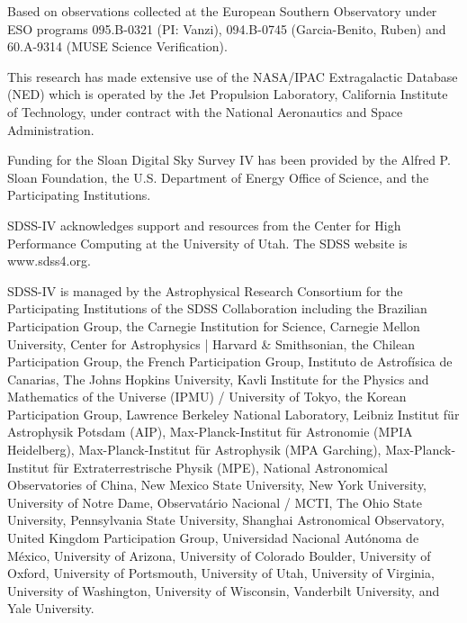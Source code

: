 \documentclass[]{aastex63}
\begin{document}
Based on observations collected at the European Southern Observatory under ESO programs 095.B-0321 (PI: Vanzi), 094.B-0745 (Garcia-Benito, Ruben) and 60.A-9314 (MUSE Science Verification).

This research has made extensive use of the NASA/IPAC Extragalactic Database (NED) which is operated by the Jet Propulsion Laboratory, California Institute of Technology, under contract with the National Aeronautics and Space Administration.

Funding for the Sloan Digital Sky 
Survey IV has been provided by the 
Alfred P. Sloan Foundation, the U.S. 
Department of Energy Office of 
Science, and the Participating 
Institutions. 

SDSS-IV acknowledges support and 
resources from the Center for High 
Performance Computing  at the 
University of Utah. The SDSS 
website is www.sdss4.org.

SDSS-IV is managed by the 
Astrophysical Research Consortium 
for the Participating Institutions 
of the SDSS Collaboration including 
the Brazilian Participation Group, 
the Carnegie Institution for Science, 
Carnegie Mellon University, Center for 
Astrophysics | Harvard \& 
Smithsonian, the Chilean Participation 
Group, the French Participation Group, 
Instituto de Astrof\'isica de 
Canarias, The Johns Hopkins 
University, Kavli Institute for the 
Physics and Mathematics of the 
Universe (IPMU) / University of 
Tokyo, the Korean Participation Group, 
Lawrence Berkeley National Laboratory, 
Leibniz Institut f\"ur Astrophysik 
Potsdam (AIP),  Max-Planck-Institut 
f\"ur Astronomie (MPIA Heidelberg), 
Max-Planck-Institut f\"ur 
Astrophysik (MPA Garching), 
Max-Planck-Institut f\"ur 
Extraterrestrische Physik (MPE), 
National Astronomical Observatories of 
China, New Mexico State University, 
New York University, University of 
Notre Dame, Observat\'ario 
Nacional / MCTI, The Ohio State 
University, Pennsylvania State 
University, Shanghai 
Astronomical Observatory, United 
Kingdom Participation Group, 
Universidad Nacional Aut\'onoma 
de M\'exico, University of Arizona, 
University of Colorado Boulder, 
University of Oxford, University of 
Portsmouth, University of Utah, 
University of Virginia, University 
of Washington, University of 
Wisconsin, Vanderbilt University, 
and Yale University.



 
\end{document}
